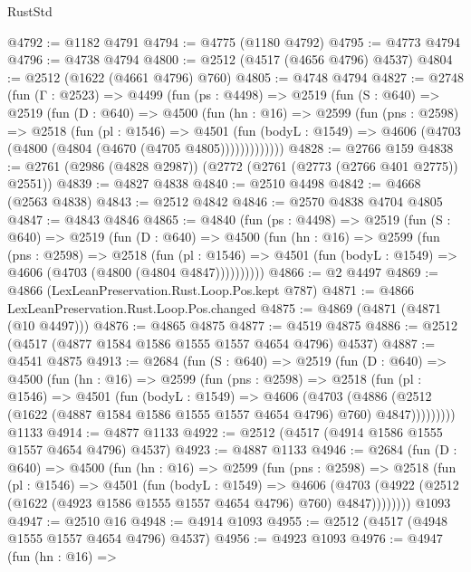 \begin{lexlean}{RustStd}
\begin{coremodule}
@4792 := @1182 @4791
@4794 := @4775 (@1180 @4792)
@4795 := @4773 @4794
@4796 := @4738 @4794
@4800 := @2512 (@4517 (@4656 @4796) @4537)
@4804 := @2512 (@1622 (@4661 @4796) @760)
@4805 := @4748 @4794
@4827 := @2748
    (fun (Γ : @2523) =>
    @4499
      (fun (ps : @4498) =>
      @2519
        (fun (S : @640) =>
        @2519
          (fun (D : @640) =>
          @4500
            (fun (hn : @16) =>
            @2599
              (fun (pns : @2598) =>
              @2518
                (fun (pl : @1546) =>
                @4501
                  (fun (bodyL : @1549) =>
                  @4606 (@4703 (@4800 (@4804 (@4670 (@4705 @4805)))))))))))))
@4828 := @2766 @159
@4838 := @2761 (@2986 (@4828 @2987)) (@2772 (@2761 (@2773 (@2766 @401 @2775)) @2551))
@4839 := @4827 @4838
@4840 := @2510 @4498
@4842 := @4668 (@2563 @4838)
@4843 := @2512 @4842
@4846 := @2570 @4838 @4704 @4805
@4847 := @4843 @4846
@4865 := @4840
    (fun (ps : @4498) =>
    @2519
      (fun (S : @640) =>
      @2519
        (fun (D : @640) =>
        @4500
          (fun (hn : @16) =>
          @2599
            (fun (pns : @2598) =>
            @2518
              (fun (pl : @1546) =>
              @4501 (fun (bodyL : @1549) => @4606 (@4703 (@4800 (@4804 @4847))))))))))
@4866 := @2 @4497
@4869 := @4866 (LexLeanPreservation.Rust.Loop.Pos.kept @787)
@4871 := @4866 LexLeanPreservation.Rust.Loop.Pos.changed
@4875 := @4869 (@4871 (@4871 (@10 @4497)))
@4876 := @4865 @4875
@4877 := @4519 @4875
@4886 := @2512 (@4517 (@4877 @1584 @1586 @1555 @1557 @4654 @4796) @4537)
@4887 := @4541 @4875
@4913 := @2684
    (fun (S : @640) =>
    @2519
      (fun (D : @640) =>
      @4500
        (fun (hn : @16) =>
        @2599
          (fun (pns : @2598) =>
          @2518
            (fun (pl : @1546) =>
            @4501
              (fun (bodyL : @1549) =>
              @4606
                (@4703
                  (@4886
                    (@2512 (@1622 (@4887 @1584 @1586 @1555 @1557 @4654 @4796) @760) @4847)))))))))
    @1133
@4914 := @4877 @1133
@4922 := @2512 (@4517 (@4914 @1586 @1555 @1557 @4654 @4796) @4537)
@4923 := @4887 @1133
@4946 := @2684
    (fun (D : @640) =>
    @4500
      (fun (hn : @16) =>
      @2599
        (fun (pns : @2598) =>
        @2518
          (fun (pl : @1546) =>
          @4501
            (fun (bodyL : @1549) =>
            @4606
              (@4703 (@4922 (@2512 (@1622 (@4923 @1586 @1555 @1557 @4654 @4796) @760) @4847))))))))
    @1093
@4947 := @2510 @16
@4948 := @4914 @1093
@4955 := @2512 (@4517 (@4948 @1555 @1557 @4654 @4796) @4537)
@4956 := @4923 @1093
@4976 := @4947
    (fun (hn : @16) =>

\end{coremodule}
\end{lexlean}
